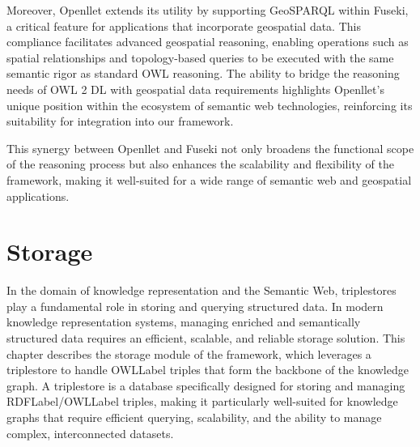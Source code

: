 Moreover, Openllet extends its utility by supporting GeoSPARQL within Fuseki, a critical feature for applications that incorporate geospatial data. This compliance facilitates advanced geospatial reasoning, enabling operations such as spatial relationships and topology-based queries to be executed with the same semantic rigor as standard OWL reasoning. The ability to bridge the reasoning needs of OWL 2 DL with geospatial data requirements highlights Openllet’s unique position within the ecosystem of semantic web technologies, reinforcing its suitability for integration into our framework.

This synergy between Openllet and Fuseki not only broadens the functional scope of the reasoning process but also enhances the scalability and flexibility of the framework, making it well-suited for a wide range of semantic web and geospatial applications.


\section{Storage}\label{VI-sec:storage}

In the domain of knowledge representation and the Semantic Web, triplestores play a fundamental role in storing and querying structured data. 
In modern knowledge representation systems, managing enriched and semantically structured data requires an efficient, scalable, and reliable storage solution. This chapter describes the storage module of the framework, which leverages a triplestore to handle \acrshort{OWLLabel} triples that form the backbone of the knowledge graph. A triplestore is a database specifically designed for storing and managing \acrshort{RDFLabel}/\acrshort{OWLLabel} triples, making it particularly well-suited for knowledge graphs that require efficient querying, scalability, and the ability to manage complex, interconnected datasets.

